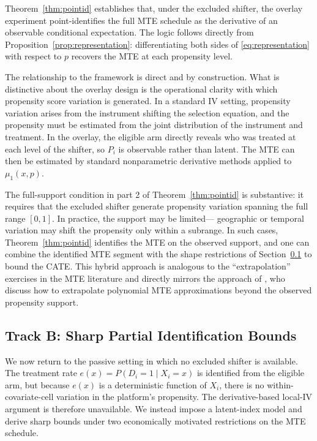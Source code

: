\documentclass[11pt]{article}
\begin{document}
Theorem~\ref{thm:pointid} establishes that, under the excluded shifter, the
overlay experiment point-identifies the full MTE schedule as the derivative of
an observable conditional expectation.  The logic follows directly from
Proposition~\ref{prop:representation}: differentiating both sides of
\eqref{eq:representation} with respect to $p$ recovers the MTE at each
propensity level.

The relationship to the \citet{heckman2005structural} framework is direct and by
construction.  What is distinctive about the overlay design is the operational
clarity with which propensity score variation is generated.  In a standard IV
setting, propensity variation arises from the instrument shifting the selection
equation, and the propensity must be estimated from the joint distribution of the
instrument and treatment.  In the overlay, the eligible arm directly reveals
who was treated at each level of the shifter, so $P_i$ is observable rather than
latent.  The MTE can then be estimated by standard nonparametric derivative
methods applied to $\mu_1(x,p)$.

The full-support condition in part 2 of Theorem~\ref{thm:pointid} is
substantive: it requires that the excluded shifter generate propensity variation
spanning the full range $[0,1]$.  In practice, the support may be limited---
geographic or temporal variation may shift the propensity only within a
subrange.  In such cases, Theorem~\ref{thm:pointid} identifies the MTE on the
observed support, and one can combine the identified MTE segment with the shape
restrictions of Section~\ref{subsec:partial} to bound the CATE.  This hybrid
approach is analogous to the ``extrapolation'' exercises in the MTE literature
\citep{carneiro2011estimating} and directly mirrors the approach of
\citeauthor{waisman2025multicell}, who discuss how to extrapolate polynomial MTE
approximations beyond the observed propensity support.

\subsection{Track B: Sharp Partial Identification Bounds}
\label{subsec:partial}

We now return to the passive setting in which no excluded shifter is available.
The treatment rate $e(x) = P(D_i=1 \mid X_i=x)$ is identified from the eligible
arm, but because $e(x)$ is a deterministic function of $X_i$, there is no
within-covariate-cell variation in the platform's propensity.  The
derivative-based local-IV argument is therefore unavailable.  We instead impose
a latent-index model and derive sharp bounds under two economically motivated
restrictions on the MTE schedule.
\end{document}
